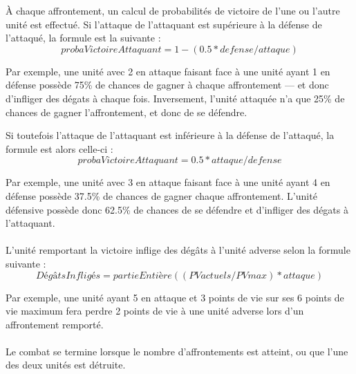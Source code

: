 	À chaque affrontement, un calcul de probabilités de victoire de l'une ou l'autre unité est effectué. Si l'attaque de l'attaquant est supérieure à la défense de l'attaqué, la formule est la suivante :
	\[ probaVictoireAttaquant = 1-(0.5*defense/attaque) \]
	
	Par exemple, une unité avec 2 en attaque faisant face à une unité ayant 1 en défense possède 75\% de chances de gagner à chaque affrontement --- et donc d'infliger des dégats à chaque fois. Inversement, l'unité attaquée n'a que 25\% de chances de gagner l'affrontement, et donc de se défendre.
	
	Si toutefois l'attaque de l'attaquant est inférieure à la défense de l'attaqué, la formule est alors celle-ci :
	\[ probaVictoireAttaquant = 0.5*attaque/defense \]

	Par exemple, une unité avec 3 en attaque faisant face à une unité ayant 4 en défense possède 37.5\% de chances de gagner chaque affrontement. L'unité défensive possède donc 62.5\% de chances de se défendre et d'infliger des dégats à l'attaquant.
	
	\paragraph{}
	L'unité remportant la victoire inflige des dégâts à l'unité adverse selon la formule suivante :
	\[ DégâtsInfligés = partieEntière((PVactuels/PVmax)*attaque) \]
	
	Par exemple, une unité ayant 5 en attaque et 3 points de vie sur ses 6 points de vie maximum fera perdre 2 points de vie à une unité adverse lors d'un affrontement remporté.
		
	\paragraph{}
	Le combat se termine lorsque le nombre d'affrontements est atteint, ou que l'une des deux unités est détruite. 
